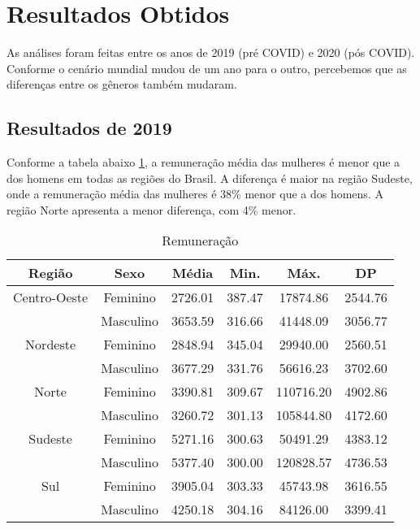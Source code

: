 \section{Resultados Obtidos}

As análises foram feitas entre os anos de 2019 (pré COVID) e 2020 (pós COVID). Conforme o cenário mundial mudou de um ano para o outro, percebemos que as diferenças entre os gêneros também mudaram.

\subsection{Resultados de 2019}

Conforme a tabela abaixo \ref{remun}, a remuneração média das mulheres é menor que a dos homens em todas as regiões do Brasil. A diferença é maior na região Sudeste, onde a remuneração média das mulheres é 38\% menor que a dos homens. A região Norte apresenta a menor diferença, com 4\% menor.

\begin{table}[htbp]
	\caption{Remuneração}
	\begin{center}
		\begin{tabular}{|c|c|c|c|c|c|}
			\hline
			\textbf{Região} & \textbf{Sexo} & \textbf{Média} & \textbf{Min.} & \textbf{Máx.} & \textbf{DP} \\ 
			\hline
																																																																			
			Centro-Oeste     & Feminino      & 2726.01         & 387.47        & 17874.86       & 2544.76     \\
			                 & Masculino     & 3653.59         & 316.66        & 41448.09       & 3056.77     \\
			\hline
			Nordeste         & Feminino      & 2848.94         & 345.04        & 29940.00       & 2560.51     \\
			                 & Masculino     & 3677.29         & 331.76        & 56616.23       & 3702.60     \\
			\hline
			Norte            & Feminino      & 3390.81         & 309.67        & 110716.20      & 4902.86     \\
			                 & Masculino     & 3260.72         & 301.13        & 105844.80      & 4172.60     \\
			\hline
			Sudeste          & Feminino      & 5271.16         & 300.63        & 50491.29       & 4383.12     \\
			                 & Masculino     & 5377.40         & 300.00        & 120828.57      & 4736.53     \\
			\hline
			Sul              & Feminino      & 3905.04         & 303.33        & 45743.98       & 3616.55     \\
			                 & Masculino     & 4250.18         & 304.16        & 84126.00       & 3399.41     \\
			\hline
		\end{tabular}
		\label{remun}
	\end{center}
\end{table}

